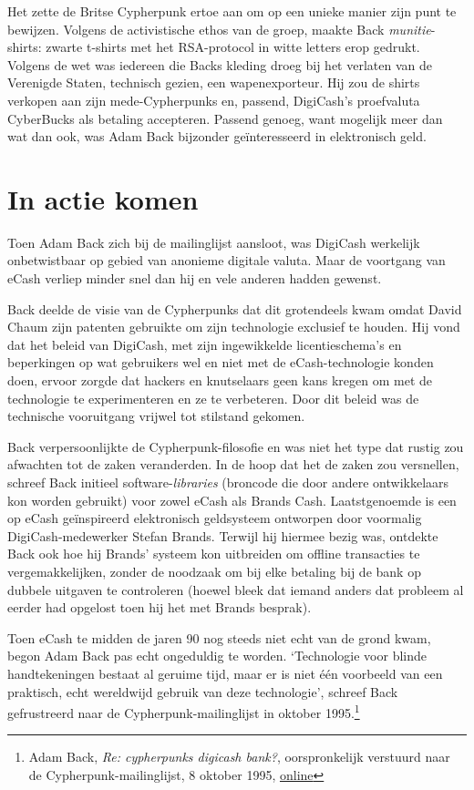 \documentclass[
  a5paper,
  smalldemyvopaper,11pt,twoside,onecolumn,openright,extrafontsizes,
hidelinks]{memoir}
\begin{document}
Het zette de Britse Cypherpunk ertoe aan om op een unieke manier zijn
punt te bewijzen. Volgens de activistische ethos van de groep, maakte
Back \emph{munitie}-shirts: zwarte t-shirts met het RSA-protocol in
witte letters erop gedrukt. Volgens de wet was iedereen die Backs
kleding droeg bij het verlaten van de Verenigde Staten, technisch
gezien, een wapenexporteur. Hij zou de shirts verkopen aan zijn
mede-Cypherpunks en, passend, DigiCash's proefvaluta CyberBucks als
betaling accepteren. Passend genoeg, want mogelijk meer dan wat dan ook,
was Adam Back bijzonder geïnteresseerd in elektronisch geld.

\section{In actie komen}\label{in-actie-komen}

Toen Adam Back zich bij de mailinglijst aansloot, was DigiCash werkelijk
onbetwistbaar op gebied van anonieme digitale valuta. Maar de voortgang
van eCash verliep minder snel dan hij en vele anderen hadden gewenst.

Back deelde de visie van de Cypherpunks dat dit grotendeels kwam omdat
David Chaum zijn patenten gebruikte om zijn technologie exclusief te
houden. Hij vond dat het beleid van DigiCash, met zijn ingewikkelde
licentieschema's en beperkingen op wat gebruikers wel en niet met de
eCash-technologie konden doen, ervoor zorgde dat hackers en knutselaars
geen kans kregen om met de technologie te experimenteren en ze te
verbeteren. Door dit beleid was de technische vooruitgang vrijwel tot
stilstand gekomen.

Back verpersoonlijkte de Cypherpunk-filosofie en was niet het type dat
rustig zou afwachten tot de zaken veranderden. In de hoop dat het de
zaken zou versnellen, schreef Back initieel software-\emph{libraries}
(broncode die door andere ontwikkelaars kon worden gebruikt) voor zowel
eCash als Brands Cash. Laatstgenoemde is een op eCash geïnspireerd
elektronisch geldsysteem ontworpen door voormalig DigiCash-medewerker
Stefan Brands. Terwijl hij hiermee bezig was, ontdekte Back ook hoe hij
Brands' systeem kon uitbreiden om offline transacties te
vergemakkelijken, zonder de noodzaak om bij elke betaling bij de bank op
dubbele uitgaven te controleren (hoewel bleek dat iemand anders dat
probleem al eerder had opgelost toen hij het met Brands besprak).

Toen eCash te midden de jaren 90 nog steeds niet echt van de grond kwam,
begon Adam Back pas echt ongeduldig te worden. `Technologie voor blinde
handtekeningen bestaat al geruime tijd, maar er is niet één voorbeeld
van een praktisch, echt wereldwijd gebruik van deze technologie',
schreef Back gefrustreerd naar de Cypherpunk-mailinglijst in oktober
1995.\footnote{Adam Back, \emph{Re: cypherpunks digicash bank?},
  oorspronkelijk verstuurd naar de Cypherpunk-mailinglijst, 8 oktober
  1995,
  \href{https://cypherpunks.venona.com/date/1995/10/msg00734.html}{online}}
\end{document}
